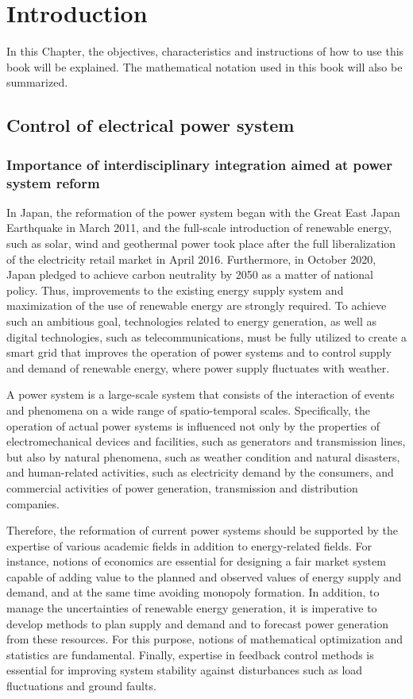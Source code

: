 \documentclass[graybox, envcountchap]{svmult}
\begin{document}
\chapter{Introduction}

In this Chapter, the objectives, characteristics and instructions of how to use
this book will be explained. The mathematical notation used in this book will
also be summarized.


\section{Control of electrical power system}

\subsection{Importance of interdisciplinary integration aimed at power system
reform}

In Japan, the reformation of the power system began with the Great East Japan
Earthquake in March 2011, and the full-scale introduction of renewable energy,
such as solar, wind and geothermal power took place after the full
liberalization of the electricity retail market in April 2016. Furthermore, in
October 2020, Japan pledged to achieve carbon neutrality by 2050 as a matter of
national policy. Thus, improvements to the existing energy supply system and
maximization of the use of renewable energy are strongly required. To achieve
such an ambitious goal, technologies related to energy generation, as well as
digital technologies, such as telecommunications, must be fully utilized to
create a smart grid that improves the operation of power systems and to control
supply and demand of renewable energy, where power supply fluctuates with
weather.

A power system is a large-scale system that consists of the interaction of
events and phenomena on a wide range of spatio-temporal scales. Specifically,
the operation of actual power systems is influenced not only by the properties
of electromechanical devices and facilities, such as generators and transmission
lines, but also by natural phenomena, such as weather condition and natural
disasters, and human-related activities, such as electricity demand by the
consumers, and commercial activities of power generation, transmission and
distribution companies.

Therefore, the reformation of current power systems should be supported by the
expertise of various academic fields in addition to energy-related fields. For
instance, notions of economics are essential for designing a fair market system
capable of adding value to the planned and observed values of energy supply and
demand, and at the same time avoiding monopoly formation. In addition, to manage
the uncertainties of renewable energy generation, it is imperative to develop
methods to plan supply and demand and to forecast power generation from these
resources. For this purpose, notions of mathematical optimization and statistics
are fundamental. Finally, expertise in feedback control methods is essential for
improving system stability against disturbances such as load fluctuations and
ground faults. 
\end{document}
